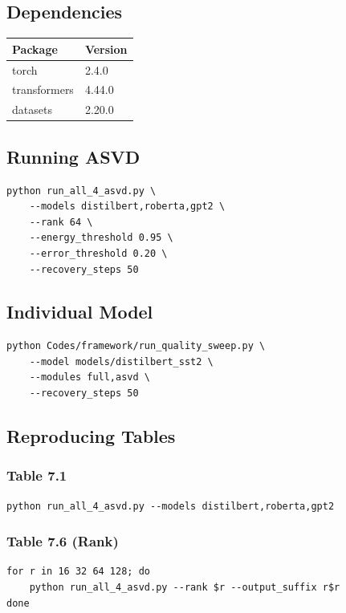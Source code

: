 \subsection{Dependencies}

\begin{table}[H]
\centering
\small
\begin{tabular}{ll}
\toprule
\textbf{Package} & \textbf{Version} \\
\midrule
torch & 2.4.0 \\
transformers & 4.44.0 \\
datasets & 2.20.0 \\
\bottomrule
\end{tabular}
\end{table}

\subsection{Running ASVD}

\begin{lstlisting}
python run_all_4_asvd.py \
    --models distilbert,roberta,gpt2 \
    --rank 64 \
    --energy_threshold 0.95 \
    --error_threshold 0.20 \
    --recovery_steps 50
\end{lstlisting}

\subsection{Individual Model}

\begin{lstlisting}
python Codes/framework/run_quality_sweep.py \
    --model models/distilbert_sst2 \
    --modules full,asvd \
    --recovery_steps 50
\end{lstlisting}

\subsection{Reproducing Tables}

\subsubsection{Table 7.1}
\begin{lstlisting}
python run_all_4_asvd.py --models distilbert,roberta,gpt2
\end{lstlisting}

\subsubsection{Table 7.6 (Rank)}
\begin{lstlisting}
for r in 16 32 64 128; do
    python run_all_4_asvd.py --rank $r --output_suffix r$r
done
\end{lstlisting}

